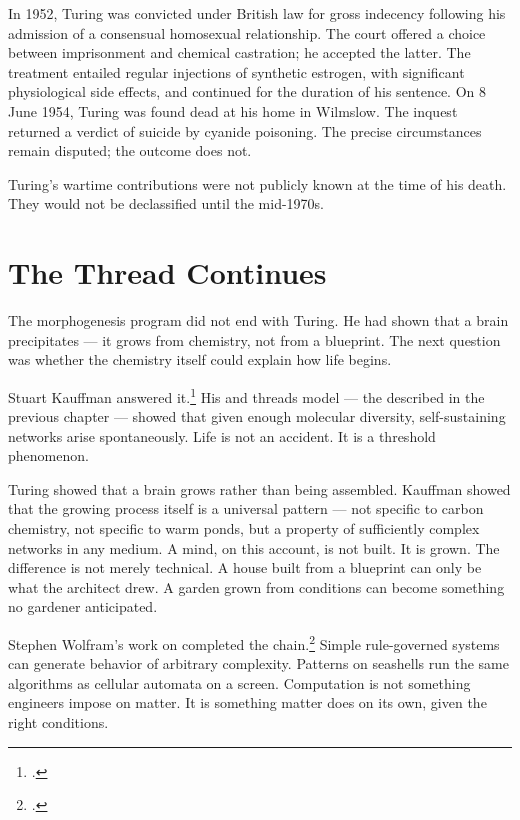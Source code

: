 
In 1952, Turing was convicted under British law for gross indecency following his admission of a consensual homosexual relationship. The court offered a choice between imprisonment and chemical castration; he accepted the latter. The treatment entailed regular injections of synthetic estrogen, with significant physiological side effects, and continued for the duration of his sentence. On 8 June 1954, Turing was found dead at his home in Wilmslow. The inquest returned a verdict of suicide by cyanide poisoning. The precise circumstances remain disputed; the outcome does not.

Turing's wartime contributions were not publicly known at the time of his death. They would not be declassified until the mid-1970s.

\section*{The Thread Continues}
\label{spine:gam-the-thread-continues}

The morphogenesis program did not end with Turing. He had shown that a brain precipitates --- it grows from chemistry, not from a blueprint. The next question was whether the chemistry itself could explain how life begins.

Stuart Kauffman answered it.\footcite{kauffman1993} His  and threads model --- the  described in the previous chapter --- showed that given enough molecular diversity, self-sustaining networks arise spontaneously. Life is not an accident. It is a threshold phenomenon.

Turing showed that a brain grows rather than being assembled. Kauffman showed that the growing process itself is a universal pattern --- not specific to carbon chemistry, not specific to warm ponds, but a property of sufficiently complex networks in any medium. A mind, on this account, is not built. It is grown. The difference is not merely technical. A house built from a blueprint can only be what the architect drew. A garden grown from conditions can become something no gardener anticipated.

Stephen Wolfram's work on  completed the chain.\footcite{wolfram2002} Simple rule-governed systems can generate behavior of arbitrary complexity. Patterns on seashells run the same algorithms as cellular automata on a screen. Computation is not something engineers impose on matter. It is something matter does on its own, given the right conditions.

